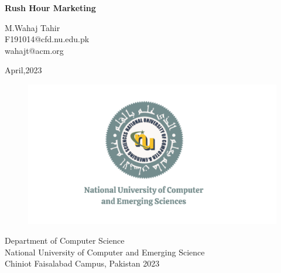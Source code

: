 \begin{Titlepage}
\begin{center}
    \vspace*{2cm}
    \textbf{\Huge Rush Hour Marketing}\\
    
      
      \vspace{0.2cm}
      \begin{center}
          \large M.Wahaj Tahir\\F191014@cfd.nu.edu.pk\\wahajt@acm.org
      \end{center} 
    
    \vspace{1.5cm}
    \begin{center}
    \large April,2023 
    \end{center}
    
    \vfill
    \vspace{0.8cm}
    \begin{figure}[hb]
        \centering
        \includegraphics[scale=0.20]{Fast-Nuces.png}
    \end{figure}
    Department of Computer Science\\ National University of Computer and Emerging Science\\ Chiniot Faisalabad Campus, Pakistan 2023
    \end{center}
\end{Titlepage}








